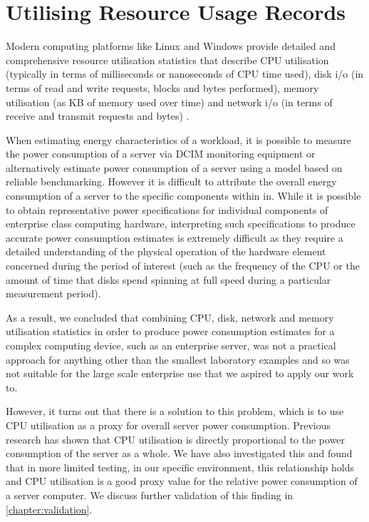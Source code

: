 \section{Utilising Resource Usage Records}
\label{section:utilisatingresourceusage}

Modern computing platforms like Linux and Windows provide detailed and comprehensive resource utilisation statistics that describe CPU utilisation (typically in terms of milliseconds or nanoseconds of CPU time used), disk i/o (in terms of read and write requests, blocks and bytes performed), memory utilisation (as KB of memory used over time) and network i/o (in terms of receive and transmit requests and bytes) \cite{unix_sar_command, windows_performance_monitor}.

When estimating energy characteristics of a workload, it is possible to measure the power consumption of a server via DCIM monitoring equipment or alternatively estimate power consumption of a server using a model based on reliable benchmarking.  However it is difficult to attribute the overall energy consumption of a server to the specific components within in.  While it is possible to obtain representative power specifications \cite{hitachi_drive_data_sheet} for individual components of enterprise class computing hardware, interpreting such specifications to produce accurate power consumption estimates is extremely difficult as they require a detailed understanding of the physical operation of the hardware element concerned during the period of interest (such as the frequency of the CPU or the amount of time that disks spend spinning at full speed during a particular measurement period).

As a result, we concluded that combining CPU, disk, network and memory utilisation statistics in order to produce power consumption estimates for a complex computing device, such as an enterprise server, was not a practical approach for anything other than the smallest laboratory examples and so was not suitable for the large scale enterprise use that we aspired to apply our work to.

However, it turns out that there is a solution to this problem, which is to use CPU utilisation as a proxy for overall server power consumption.  Previous research \cite{bashroush2018_hardwarerefresh} has shown that CPU utilisation is directly proportional to the power consumption of the server as a whole.  We have also investigated this and found that in more limited testing, in our specific environment, this relationship holds and CPU utilisation is a good proxy value for the relative power consumption of a server computer.  We discuss further validation of this finding in \cref{chapter:validation}.

